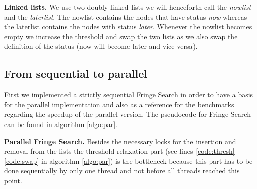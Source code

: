 \documentclass[letterpaper]{article}
\newcommand{\mypar}[1]{{\bf #1.}}
\begin{document}
\mypar{Linked lists}
We use two doubly linked lists we will henceforth call the \textit{nowlist} and the \textit{laterlist}. The nowlist contains the nodes that have status \textit{now} whereas the laterlist contains the nodes with status \textit{later}. Whenever the nowlist becomes empty we increase the threshold and swap the two lists as we also swap the definition of the status (now will become later and vice versa). 

\subsection{From sequential to parallel}\label{ssec:seqpar}

First we implemented a strictly sequential Fringe Search in order to have a basis for the parallel implementation and also as a reference for the benchmarks regarding the speedup of the parallel version. The pseudocode for Fringe Search can be found in algorithm \ref{algo:par}.

\mypar{Parallel Fringe Search}
Besides the necessary locks for the insertion and removal from the lists the threshold relaxation part (see lines \ref{code:thresh}-\ref{code:swap} in algorithm \ref{algo:par}) is the bottleneck because this part has to be done sequentially by only one thread and not before all threads reached this point.
\end{document}
